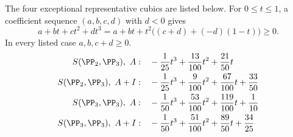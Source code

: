 The four exceptional representative cubics are listed below. For
$0\leq t\leq1$, a coefficient sequence $(a,b,c,d)$ with $d<0$ gives
\[
a+bt+ct^2+dt^3=a+bt+t^2\bigl((c+d)+(-d)(1-t)\bigr)\geq0.
\]
In every listed case $a,b,c+d\geq0$.
\begin{align*}
S(\PP_2,\PP_3),\ A:\quad &-\frac{1}{25}t^{3}+\frac{13}{100}t^{2}+\frac{21}{50}t\\
S(\PP_2,\PP_3),\ A+I:\quad &-\frac{1}{25}t^{3}+\frac{9}{100}t^{2}+\frac{67}{100}t+\frac{33}{50}\\
S(\PP_3,\PP_3),\ A:\quad &-\frac{1}{50}t^{3}+\frac{53}{100}t^{2}+\frac{119}{100}t+\frac{1}{10}\\
S(\PP_3,\PP_3),\ A+I:\quad &-\frac{1}{50}t^{3}+\frac{51}{100}t^{2}+\frac{89}{50}t+\frac{34}{25}\\
\end{align*}
